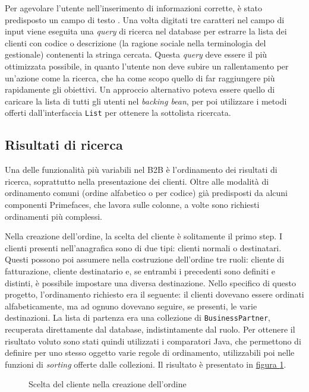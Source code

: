 Per agevolare l'utente nell'inserimento di informazioni corrette, è stato predisposto un campo di testo . Una volta digitati tre caratteri nel campo di input viene eseguita una \textit{query} di ricerca nel database per estrarre la lista dei clienti con codice o descrizione (la ragione sociale nella terminologia del gestionale) contenenti la stringa cercata. Questa \textit{query} deve essere il più ottimizzata possibile, in quanto l'utente non deve subire un rallentamento per un'azione come la ricerca, che ha come scopo quello di far raggiungere più rapidamente gli obiettivi. Un approccio alternativo poteva essere quello di caricare la lista di tutti gli utenti nel \textit{backing bean}, per poi utilizzare i metodi offerti dall'interfaccia \texttt{List} per ottenere la sottolista ricercata.

\subsection{Risultati di ricerca}
Una delle funzionalità più variabili nel B2B è l'ordinamento dei risultati di ricerca, soprattutto nella presentazione dei clienti. Oltre alle modalità di ordinamento comuni (ordine alfabetico o per codice) già predisposti da alcuni componenti Primefaces, che lavora sulle colonne, a volte sono richiesti ordinamenti più complessi.

Nella creazione dell'ordine, la scelta del cliente è solitamente il primo step. I clienti presenti nell'anagrafica sono di due tipi: clienti normali o destinatari. Questi possono poi assumere nella costruzione dell'ordine tre ruoli: cliente di fatturazione, cliente destinatario e, se entrambi i precedenti sono definiti e distinti, è possibile impostare una diversa destinazione. Nello specifico di questo progetto, l'ordinamento richiesto era il seguente: il clienti dovevano essere ordinati alfabeticamente, ma ad ognuno dovevano seguire, se presenti, le varie destinazioni. La lista di partenza era una collezione di \texttt{BusinessPartner}, recuperata direttamente dal database, indistintamente dal ruolo. Per ottenere il risultato voluto sono stati quindi utilizzati i comparatori Java, che permettono di definire per uno stesso oggetto varie regole di ordinamento, utilizzabili poi nelle funzioni di \textit{sorting} offerte dalle collezioni. Il risultato è presentato in \hyperref[fig:listaclienti]{figura \ref{fig:listaclienti}}.
\begin{figure}
	\centering
	\caption{Scelta del cliente nella creazione dell'ordine}
	\label{fig:listaclienti}
\end{figure}

